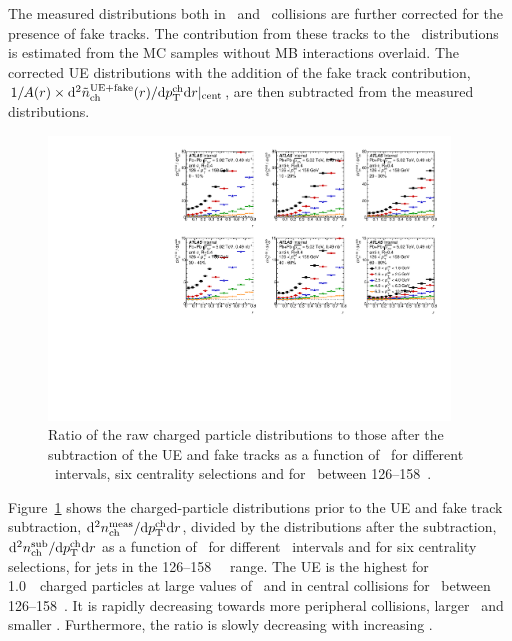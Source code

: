 The measured distributions both in \pp\ and \PbPb\ collisions are further corrected for the presence of fake tracks. The contribution from these tracks to the \Dptr\ distributions
is estimated from the MC samples without MB interactions overlaid. 
The corrected UE distributions with the addition of the fake track contribution, $1/A(r) \times \mathrm{d}^2 \mbox{$\tilde{n}_{\mathrm{ch}}^{\mathrm{UE+fake}}$} (r) / \mathrm{d} \mbox{$p_{\mathrm{T}}^{\mathrm{ch}}$} \mathrm{d} r |_{\mathrm{cent}}$, are then subtracted from the measured distributions.


\begin{figure}
\centerline{
 \includegraphics[width=0.95\textwidth]{figures/performance/UE_B2S_single_0.pdf}
}
\caption{
Ratio of the raw charged particle distributions to those after the subtraction of the UE
   and fake tracks as a function of \rvar\ for different \pttrk\ intervals, six centrality selections and for \ptjet\ between 126--158~\GeV.    
  }
\label{fig:UEsize}
\end{figure}

Figure~\ref{fig:UEsize} shows the charged-particle distributions prior to the UE and fake track subtraction, $ \mathrm{d}^2 \mbox{$n_{\mathrm{ch}}^{\mathrm{meas}}$} / \mathrm{d} \mbox{$p_{\mathrm{T}}^{\mathrm{ch}}$} \mathrm{d} r$, divided by the distributions after the subtraction, $ \mathrm{d}^2 \mbox{$n_{\mathrm{ch}}^{\mathrm{sub}}$} / \mathrm{d} \mbox{$p_{\mathrm{T}}^{\mathrm{ch}}$} \mathrm{d} r $ as a function of \rvar\ for different \pttrk\ intervals and for six centrality selections, for jets in the 126--158 \GeV\  \ptjet\ range. The UE is the highest for 1.0~\GeV\ charged particles at large values of \rvar\ and in central collisions for \ptjet\ between 126--158~\GeV. It is rapidly decreasing towards more peripheral collisions, larger \pttrk\ and smaller \rvar.
Furthermore, the ratio is slowly decreasing with increasing \ptjet.


